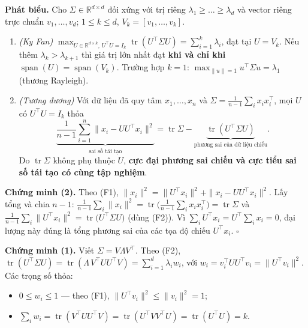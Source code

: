 \textbf{Phát biểu.} Cho \(\Sigma\in\mathbb R^{d\times d}\) đối xứng với trị riêng \(\lambda_1\ge\dots\ge\lambda_d\) và vector riêng trực chuẩn \(v_1,\dots,v_d\); \(1\le k\le d\), \(V_k=[v_1,\dots,v_k]\).

\begin{enumerate}
\def\labelenumi{\arabic{enumi}.}

\item
  \emph{(Ky Fan)} \(\displaystyle\max_{U\in\mathbb R^{d\times k},\,U^\top U=I_k}\operatorname{tr}(U^\top\Sigma U)=\sum_{i=1}^k\lambda_i\), đạt tại \(U=V_k\). Nếu thêm \(\lambda_k>\lambda_{k+1}\) thì giá trị lớn nhất đạt \textbf{khi và chỉ khi} \(\operatorname{span}(U)=\operatorname{span}(V_k)\). Trường hợp \(k=1\): \(\max_{\|u\|=1}u^\top\Sigma u=\lambda_1\) (thương Rayleigh).
\item
  \emph{(Tương đương)} Với dữ liệu đã quy tâm \(x_1,\dots,x_n\) và \(\Sigma=\frac1{n-1}\sum_i x_ix_i^\top\), mọi \(U\) có \(U^\top U=I_k\) thỏa \[\underbrace{\frac1{n-1}\sum_{i=1}^n\|x_i-UU^\top x_i\|^2}_{\text{sai số tái tạo}}=\operatorname{tr}\Sigma-\underbrace{\operatorname{tr}(U^\top\Sigma U)}_{\text{phương sai của dữ liệu chiếu}} .\] Do \(\operatorname{tr}\Sigma\) không phụ thuộc \(U\), \textbf{cực đại phương sai chiếu và cực tiểu sai số tái tạo có cùng tập nghiệm}.
\end{enumerate}

\textbf{Chứng minh (2).} Theo (F1), \(\|x_i\|^2=\|U^\top x_i\|^2+\|x_i-UU^\top x_i\|^2\). Lấy tổng và chia \(n-1\): \(\frac1{n-1}\sum_i\|x_i\|^2=\operatorname{tr}\big(\frac1{n-1}\sum_ix_ix_i^\top\big)=\operatorname{tr}\Sigma\) và \(\frac1{n-1}\sum_i\|U^\top x_i\|^2=\operatorname{tr}\big(U^\top\Sigma U\big)\) (dùng (F2)). Vì \(\sum_iU^\top x_i=U^\top\sum_ix_i=0\), đại lượng này đúng là tổng phương sai của các tọa độ chiếu \(U^\top x_i\). \(\square\)

\textbf{Chứng minh (1).} Viết \(\Sigma=V\Lambda V^\top\). Theo (F2), \(\operatorname{tr}(U^\top\Sigma U)=\operatorname{tr}(\Lambda\,V^\top UU^\top V)=\sum_{i=1}^d\lambda_iw_i\), với \(w_i=v_i^\top UU^\top v_i=\|U^\top v_i\|^2\). Các trọng số thỏa:

\begin{itemize}

\item
  \(0\le w_i\le1\) --- theo (F1), \(\|U^\top v_i\|^2\le\|v_i\|^2=1\);
\item
  \(\sum_iw_i=\operatorname{tr}(V^\top UU^\top V)=\operatorname{tr}(U^\top VV^\top U)=\operatorname{tr}(U^\top U)=k\).
\end{itemize}


